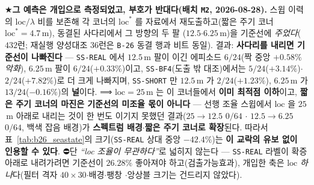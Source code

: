 \documentclass[11pt]{report}
\numberwithin{equation}{chapter}
\numberwithin{figure}{chapter}
\numberwithin{table}{chapter}
\begin{document}
\begin{itemize}
        ★\textbf{그 예측은 개입으로 측정되었고, 부호가 반대다(배치 \texttt{M2},
        2026-08-28).} 스윕 이력의 $\mathrm{loc}/\lambda$ 비를 보존해 각 코너의
        $\mathrm{loc}^{*}$ 를 자료에서 재도출하고(짧은 주기 코너
        $\mathrm{loc}^{*} = 4.7$\,m), 동결된 사다리에서 그 방향의 두 팔
        ($12.5$$\cdot$$6.25$\,m)을 기준선에 \emph{주었다}($432$런; 재실행 양성대조
        $36$런은 \texttt{B-26} 동결 행과 비트 동일). 결과: \textbf{사다리를 내리면
        기준선이 나빠진다} --- \texttt{SS-REAL} 에서 $12.5$\,m 팔이 이긴 에피소드
        $6/24$(짝 중앙 $+0.58\%$ \emph{악화}), $6.25$\,m 팔이 $6/24$($+0.33\%$)이고,
        \texttt{SS-BF4}(도출 밖 대조)에서는 $5/24$($+3.14\%$)$\cdot$$2/24$($+7.82\%$)로
        더 크게 나빠지며, \texttt{SS-SHORT} 만 $12.5$\,m 가 $2/24$($+1.23\%$),
        $6.25$\,m 가 $13/24$($-0.16\%$)의 \textbf{널}이다. ⟹ $\mathrm{loc} = 25$\,m 는
        이 코너들에서 \textbf{이미 최적점 이하}이고, \textbf{짧은 주기 코너의 마진은
        기준선의 미조율 몫이 아니다} --- 선행 조율 스윕에서 $\mathrm{loc}$ 을 $25$\,m
        아래로 내리는 것이 한 번도 이기지 못했던 결과($25 \to 12.5$ $0/64$ $\cdot$
        $12.5 \to 6.25$ $0/64$, 백색 잡음 배경)가 \textbf{스펙트럼 배경$\cdot$짧은 주기
        코너로 확장}된다. 따라서 표~\ref{tab:b26_seastate}의 크기(\texttt{SS-REAL}
        상대 중앙 $-42.4\%$)는 \textbf{이 교락의 유보 없이 인용할 수 있다}.
        ⛔단 \emph{``loc 조율이 무관하다''}로 넓히지 않는다 --- \texttt{SS-REAL} 라벨이
        확증 아래로 내려가려면 기준선이 $26.28\%$ 좋아져야 하고(검출가능효과), 개입한
        축은 $\mathrm{loc}$ \emph{하나}다(필터 격자 $40\times30$$\cdot$배경$\cdot$팽창
        $\cdot$앙상블 크기는 건드리지 않았다).


\end{itemize}
\end{document}
